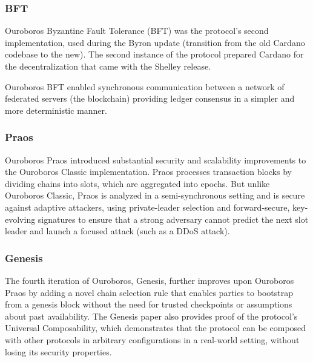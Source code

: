 \vspace{0.5cm}

\subsubsection{BFT}

Ouroboros Byzantine Fault Tolerance (BFT) was the protocol's second implementation, 
used during the Byron update (transition from the old Cardano codebase to the 
new). The second instance of the protocol prepared Cardano for the decentralization 
that came with the Shelley release.

\vspace{0.2cm}

\noindent
Ouroboros BFT enabled synchronous communication between a network of federated 
servers (the blockchain) providing ledger consensus in a simpler and more 
deterministic manner.

\vspace{0.5cm}

\subsubsection{Praos}

Ouroboros Praos introduced substantial security and scalability improvements to 
the Ouroboros Classic implementation. Praos processes transaction blocks by dividing 
chains into slots, which are aggregated into epochs. But unlike Ouroboros Classic, 
Praos is analyzed in a semi-synchronous setting and is secure against adaptive 
attackers, using private-leader selection and forward-secure, key-evolving signatures 
to ensure that a strong adversary cannot predict the next slot leader and launch 
a focused attack (such as a DDoS attack).

\vspace{0.5cm}

\subsubsection{Genesis}

The fourth iteration of Ouroboros, Genesis, further improves upon Ouroboros 
Praos by adding a novel chain selection rule that enables parties to bootstrap 
from a genesis block without the need for trusted checkpoints or assumptions 
about past availability. The Genesis paper also provides proof of the protocol's 
Universal Composability, which demonstrates that the protocol can be composed 
with other protocols in arbitrary configurations in a real-world setting, without 
losing its security properties.

